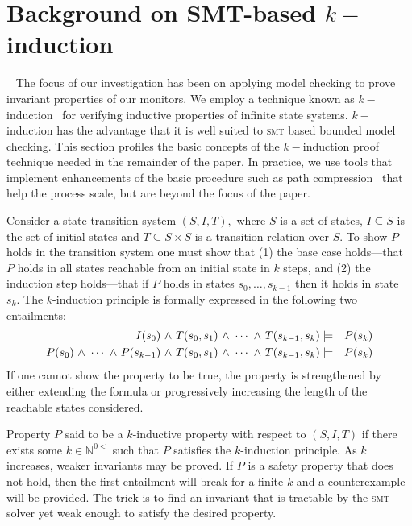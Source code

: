 \section{Background on SMT-based $k-$induction}~\label{sec:background} 
The focus of our  investigation has  been on applying model checking to  prove
invariant properties of our monitors.   We  
employ a  technique known as $k-$induction~\cite{Sheeran00,EenS03} for verifying inductive
properties of infinite state systems.   $k-$induction  has the
advantage that it is well suited  to  \textsc{smt} 
based bounded model checking. This section profiles the
basic concepts of the  $k-$induction proof technique needed in the
remainder of the paper. In practice, we use tools that implement  enhancements of the basic procedure such as path compression~\cite{dMRS03} that help the process scale, but are beyond the focus of the paper. 

Consider  a state transition system  $(S,I,T),$
where $S$ is a set of states, $I \subseteq S$ is the set of initial
states and $T \subseteq S \times S $ is a transition relation over
$S.$ To show $P$ holds in the transition system one must show that (1)
the base case holds---that $P$ holds in all states reachable
from an initial state in $k$ steps, and (2) the induction step holds---that if $P$ holds in states $s_0,\ldots,s_{k-1}$ then it holds in
state $s_k.$ The $k$-induction principle is formally expressed in the
following two entailments:
\begin{eqnarray*}
I(s_0) {\ \wedge \ } T(s_0,s_1) {\ \wedge \ } \cdots {\ \wedge \ } T(s_{k-1},s_k) &\models&
P(s_k) \\
P(s_0) {\ \wedge \ } \cdots {\ \wedge \ } P(s_{k-1}) {\ \wedge \ } T(s_0,s_1) {\ \wedge \ } \cdots {\ \wedge \ } T(s_{k-1},s_k) &\models&
P(s_k) 
\end{eqnarray*} 
If one cannot show the property to be true, the
property is strengthened by either extending the formula or
progressively increasing the length of the reachable states
considered.  

Property $P$ said to be a $k$-inductive property with respect to
$(S,I,T)$ if there exists some $k \in \mathbb{N}^{0<}$ such that $P$
satisfies the $k$-induction principle. As $k$ increases, weaker
invariants may be proved. If $P$ is a safety property that does not hold, then the first entailment will break for a finite $k$ and a counterexample will be provided. The trick is to find an invariant that is
tractable by the \textsc{smt} solver yet weak enough to satisfy the desired
property.  
